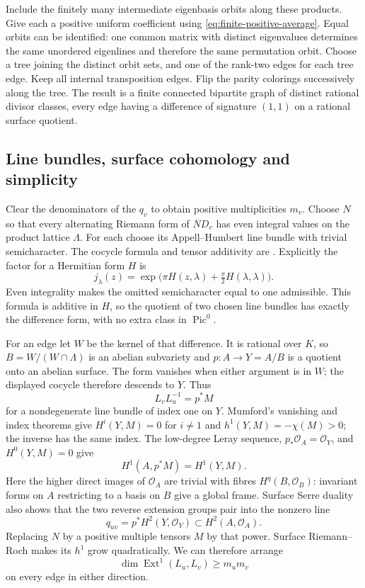 Include the finitely many intermediate eigenbasis orbits along
these products.  Give each a positive uniform coefficient using
\eqref{eq:finite-positive-average}.  Equal orbits can be identified:
one common matrix with distinct eigenvalues determines the same
unordered eigenlines and therefore the same permutation orbit.
Choose a tree joining the distinct orbit sets, and one of the
rank-two edges for each tree edge.  Keep all internal transposition
edges.  Flip the parity colorings successively along the tree.
The result is a finite connected bipartite graph of distinct rational
divisor classes, every edge having a difference of signature $(1,1)$
on a rational surface quotient.

\subsection{Line bundles, surface cohomology and simplicity}

Clear the denominators of the $q_v$ to obtain positive multiplicities
$m_v$.  Choose $N$ so that every alternating Riemann form of $ND_v$
has even integral values on the product lattice $\Lambda$.
For each choose its Appell--Humbert line bundle with trivial
semicharacter.  The cocycle formula and tensor additivity are
\cite[\S2, pp.~20--21]{MumfordAV}.
Explicitly the factor for a Hermitian form $H$ is
\[
 j_\lambda(z)=
 \exp\bigl(\pi H(z,\lambda)+\tfrac\pi2H(\lambda,\lambda)\bigr).
\]
Even integrality makes the omitted semicharacter equal to one
admissible.  This formula is additive in $H$, so the quotient of
two chosen line bundles has exactly the difference form, with
no extra class in $\operatorname{Pic}^0$.

For an edge let $W$ be the kernel of that difference.  It is rational
over $K$, so $B=W/(W\cap\Lambda)$ is an abelian subvariety and
$p:A\to Y=A/B$ is a quotient onto an abelian surface.
The form vanishes when either argument is in $W$; the displayed
cocycle therefore descends to $Y$.  Thus
\[
 L_vL_u^{-1}=p^*M
\]
for a nondegenerate line bundle of index one on $Y$.
Mumford's vanishing and index theorems
\cite[\S16, pp.~150,155,162]{MumfordAV} give
$H^i(Y,M)=0$ for $i\ne1$ and $h^1(Y,M)=-\chi(M)>0$;
the inverse has the same index.
The low-degree Leray sequence, $p_*\mathcal O_A=\mathcal O_Y$,
and $H^0(Y,M)=0$ give
\[
 H^1(A,p^*M)=H^1(Y,M).
\]
Here the higher direct images of $\mathcal O_A$ are trivial with
fibres $H^q(B,\mathcal O_B)$: invariant forms on $A$ restricting to
a basis on $B$ give a global frame.
Surface Serre duality also shows that the two reverse extension
groups pair into the nonzero line
\begin{equation}
 q_{uv}=p^*H^2(Y,\mathcal O_Y)\subset H^2(A,\mathcal O_A).
 \label{eq:edge-surface-line}
\end{equation}
Replacing $N$ by a positive multiple tensors $M$ by that power.
Surface Riemann--Roch makes its $h^1$ grow quadratically.
We can therefore arrange
\[
 \dim\operatorname{Ext}^1(L_u,L_v)\ge m_um_v
\]
on every edge in either direction.

